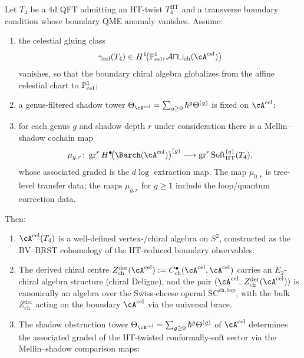 \begin{theorem}
\label{thm:universal-celestial-holography}
Let $T_4$ be a $4$d QFT admitting an HT-twist
$T_4^{\mathrm{HT}}$ and a transverse boundary condition whose boundary
QME anomaly vanishes. Assume:
\begin{enumerate}[label=\textup{(\alph*)}]
\item the celestial gluing class
\[
\gamma_{\mathrm{cel}}(T_4)\in
H^1\!\bigl(\PP^1_{\mathrm{cel}},
\mathcal{Aut}_{\mathrm{ch}}(\cA^{\mathrm{cel}})\bigr)
\]
vanishes, so that the boundary chiral algebra globalizes from the
affine celestial chart to $\mathbb P^1_{\mathrm{cel}}$;
\item a genus-filtered shadow tower
\(\Theta_{\cA^{\mathrm{cel}}}=\sum_{g\ge0}\hbar^g\Theta^{(g)}\)
is fixed on \(\cA^{\mathrm{cel}}\);
\item for each genus \(g\) and shadow depth \(r\) under consideration there is a Mellin--shadow
cochain map
\[
\mu_{g,r}\colon
\gr^r H^\bullet\!\bigl(\Barch(\cA^{\mathrm{cel}})\bigr)^{(g)}
\longrightarrow
\gr^r\mathrm{Soft}_{\mathrm{HT}}^{(g)}(T_4),
\]
whose associated graded is the \(d\log\) extraction map.  The map \(\mu_{0,r}\) is tree-level
transfer data; the maps \(\mu_{g,r}\) for \(g\ge1\) include the loop/quantum correction data.
\end{enumerate}
Then:
\begin{enumerate}[label=\textup{(\roman*)}]
\item $\cA^{\mathrm{cel}}(T_4)$ is a well-defined vertex-/chiral algebra
on $S^2$, constructed as the BV--BRST cohomology of the HT-reduced
boundary observables.
\item The derived chiral centre
$Z_{\mathrm{ch}}^{\mathrm{der}}(\cA^{\mathrm{cel}})
 := C^{\bullet}_{\mathrm{ch}}(\cA^{\mathrm{cel}},\cA^{\mathrm{cel}})$
carries an $E_2$-chiral algebra structure (chiral Deligne), and the
pair
$(\cA^{\mathrm{cel}},\, Z_{\mathrm{ch}}^{\mathrm{der}}(\cA^{\mathrm{cel}}))$
is canonically an algebra over the Swiss-cheese operad
$\mathrm{SC}^{\mathrm{ch,top}}$, with the bulk $Z^{\mathrm{der}}_{\mathrm{ch}}$
acting on the boundary $\cA^{\mathrm{cel}}$ via the universal brace.
\item The shadow obstruction tower
$\Theta_{\cA^{\mathrm{cel}}} = \sum_{g\geq 0}\hbar^g \Theta^{(g)}$ of
$\cA^{\mathrm{cel}}$ determines the associated graded of the
HT-twisted conformally-soft sector via the Mellin--shadow comparison
maps:
\begin{itemize}

\end{itemize}
\end{enumerate}
\end{theorem}
